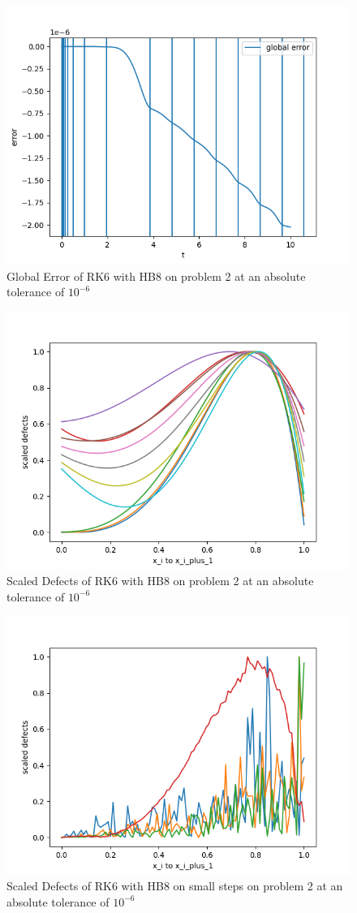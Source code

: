 \documentclass{article}
\begin{document}
\begin{figure}[H]
\centering
\includegraphics[width=0.7\linewidth]{./figures/rk6_with_hb8_p2_global_error}
\caption{Global Error of RK6 with HB8 on problem 2 at an absolute tolerance of $10^{-6}$}
\label{fig:rk6_with_hb8_p2_global_error}
\end{figure}

\begin{figure}[H]
\centering
\includegraphics[width=0.7\linewidth]{./figures/rk6_with_hb8_p2_scaled_defects}
\caption{Scaled Defects of RK6 with HB8 on problem 2 at an absolute tolerance of $10^{-6}$}
\label{fig:rk6_with_hb8_p2_scaled_defects}
\end{figure}

\begin{figure}[H]
\centering
\includegraphics[width=0.7\linewidth]{./figures/rk6_with_hb8_p2_scaled_defects_small_steps}
\caption{Scaled Defects of RK6 with HB8 on small steps on problem 2 at an absolute tolerance of $10^{-6}$}
\label{fig:rk6_with_hb8_p2_scaled_defects_small_steps}
\end{figure}
\end{document}
